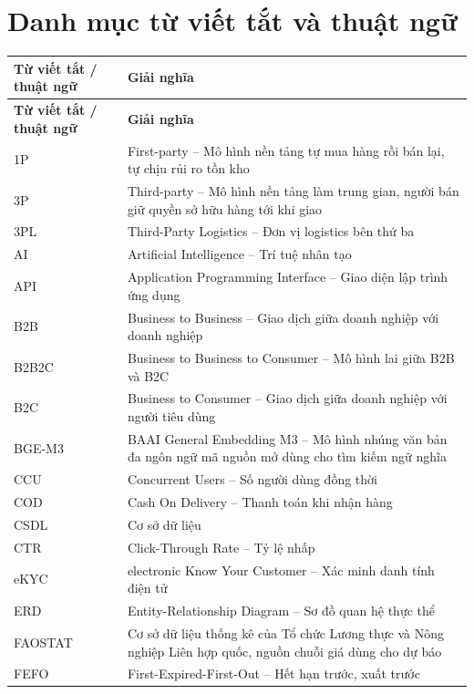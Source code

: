 \chapter*{Danh mục từ viết tắt và thuật ngữ}

\begingroup
\small
\renewcommand{\arraystretch}{1.1}
\setlength{\tabcolsep}{5pt}
\begin{longtable}{L{3.4cm} L{12cm}}
\toprule
{}
\textbf{Từ viết tắt / thuật ngữ} & \textbf{Giải nghĩa} \\
\midrule
\endfirsthead
\toprule
{}
\textbf{Từ viết tắt / thuật ngữ} & \textbf{Giải nghĩa} \\
\midrule
\endhead
\bottomrule
\endfoot
1P & First-party -- Mô hình nền tảng tự mua hàng rồi bán lại, tự chịu rủi ro tồn kho \\
3P & Third-party -- Mô hình nền tảng làm trung gian, người bán giữ quyền sở hữu hàng tới khi giao \\
3PL & Third-Party Logistics -- Đơn vị logistics bên thứ ba \\
AI & Artificial Intelligence -- Trí tuệ nhân tạo \\
API & Application Programming Interface -- Giao diện lập trình ứng dụng \\
B2B & Business to Business -- Giao dịch giữa doanh nghiệp với doanh nghiệp \\
B2B2C & Business to Business to Consumer -- Mô hình lai giữa B2B và B2C \\
B2C & Business to Consumer -- Giao dịch giữa doanh nghiệp với người tiêu dùng \\
BGE-M3 & BAAI General Embedding M3 -- Mô hình nhúng văn bản đa ngôn ngữ mã nguồn mở dùng cho tìm kiếm ngữ nghĩa \\
CCU & Concurrent Users -- Số người dùng đồng thời \\
COD & Cash On Delivery -- Thanh toán khi nhận hàng \\
CSDL & Cơ sở dữ liệu \\
CTR & Click-Through Rate -- Tỷ lệ nhấp \\
eKYC & electronic Know Your Customer -- Xác minh danh tính điện tử \\
ERD & Entity-Relationship Diagram -- Sơ đồ quan hệ thực thể \\
FAOSTAT & Cơ sở dữ liệu thống kê của Tổ chức Lương thực và Nông nghiệp Liên hợp quốc, nguồn chuỗi giá dùng cho dự báo \\
FEFO & First-Expired-First-Out -- Hết hạn trước, xuất trước \\

\end{longtable}
